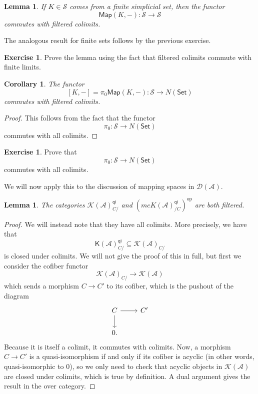 \documentclass[10pt]{amsart}
\newtheorem{cor}[thm]{Corollary}
\newtheorem{lem}[thm]{Lemma}
\theoremstyle{definition}
\newtheorem{exer}[thm]{Exercise}
\theoremstyle{remark}
\theoremstyle{plain}
\theoremstyle{definition}
\theoremstyle{remark}
\newcommand{\mc}[1]{\mathcal{#1}}
\newcommand{\ms}[1]{\mathsf{#1}}
\newcommand{\1}{\mathbf{1}}
\newcommand{\2}{\mathbf{2}}
\newcommand{\3}{\mathbf{3}}
\DeclareMathOperator{\op}{op}
\begin{document}
\begin{lem}
    If $K \in \mc{S}$ comes from a finite simplicial set, then the functor
    \[ \ms{Map}(K, -) \colon \mc{S} \to \mc{S} \]
    commutes with filtered colimits.
\end{lem}

The analogous result for finite sets follows by the previous exercise.

\begin{exer}
    Prove the lemma using the fact that filtered colimits commute with finite limits.
\end{exer}

\begin{cor}
    The functor
    \[ [K,-] = \pi_0 \ms{Map}(K, -) \colon \mc{S} \to N(\ms{Set}) \]
    commutes with filtered colimits.
\end{cor}

\begin{proof}
    This follows from the fact that the functor
    \[ \pi_0 \colon \mc{S} \to N(\ms{Set}) \]
    commutes with all colimits.
\end{proof}

\begin{exer}
    Prove that
    \[ \pi_0 \colon \mc{S} \to N(\ms{Set}) \]
    commutes with all colimits.
\end{exer}

We will now apply this to the discussion of mapping spaces in $\mc{D}(\mc{A})$.

\begin{lem}
    The categories $\mc{K}(\mc{A})_{C/}^{\ms{qi}}$ and $(mc{K}(\mc{A})_{/C}^{\ms{qi}})^{\op}$ are both filtered.
\end{lem}

\begin{proof}
    We will instead note that they have all colimits. More precisely, we have that
    \[ \ms{K}(\mc{A})_{C/}^{\ms{qi}} \subseteq \mc{K}(\mc{A})_{C/} \]
    is closed under colimits. We will not give the proof of this in full, but first we consider the cofiber functor
    \[ \mc{K}(\mc{A})_{C/} \to \mc{K}(\mc{A}) \]
    which sends a morphism $C \to C'$ to its cofiber, which is the pushout of the diagram
    \begin{equation*}
    \begin{tikzcd}
        C \ar{r} \ar{d} & C' \\
        0.
    \end{tikzcd}
    \end{equation*}
    Because it is itself a colimit, it commutes with colimits. Now, a morphism $C \to C'$ is a quasi-isomorphism if and only if its cofiber is acyclic (in other words, quasi-isomorphic to $0$), so we only need to check that acyclic objects in $\mc{K}(\mc{A})$ are closed under colimits, which is true by definition. A dual argument gives the result in the over category.
\end{proof}
\end{document}
